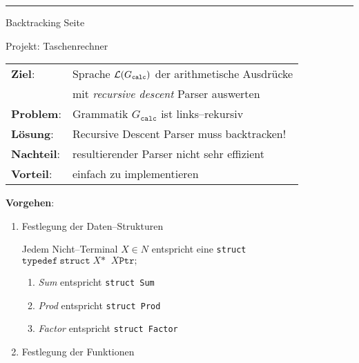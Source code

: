 \begin{slide}{}
\vspace*{\fill}
\tiny \addtocounter{mypage}{1}
\rule{17cm}{1mm}
Backtracking  \hspace*{\fill} Seite 
\end{slide}


\begin{slide}{}
\normalsize

\begin{center}
Projekt: Taschenrechner
\end{center}
\vspace*{0.5cm}

\footnotesize
\begin{tabular}{ll}
\textbf{Ziel}:     & Sprache ${\cal L}(G_{\mathtt{calc}})$ der arithmetische Ausdr\"ucke    \\
                  & mit \emph{recursive descent} Parser auswerten  \\[0.3cm]
\textbf{Problem}:  & Grammatik $G_{\mathtt{calc}}$ ist links--rekursiv                 \\[0.3cm]
\textbf{L\"osung}:   & Recursive Descent Parser muss backtracken!          \\[0.3cm]
\textbf{Nachteil}: & resultierender Parser nicht sehr effizient          \\[0.3cm]
\textbf{Vorteil}:  & einfach zu implementieren                         
\end{tabular}

\textbf{Vorgehen}:
\begin{enumerate}
\item Festlegung der Daten--Strukturen

      Jedem Nicht--Terminal $X \in N$ entspricht eine \texttt{struct} \\[0.3cm]
      \hspace*{1.3cm} $\mathtt{typedef\ struct} \;X\mathtt{*}\;\;  X\mathtt{Ptr;}$
      \begin{enumerate}
      \item \textsl{Sum} entspricht  \texttt{struct Sum}
      \item \textsl{Prod} entspricht \texttt{struct Prod}
      \item \textsl{Factor} entspricht \texttt{struct Factor}
      \end{enumerate}
\item Festlegung der Funktionen


\end{enumerate}
\end{slide}
